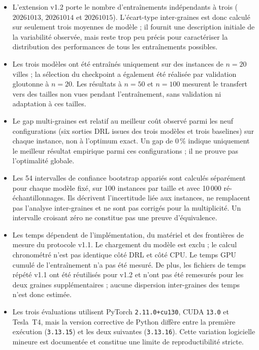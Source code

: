 \documentclass[12pt, a4paper, twoside, openright]{book}
\begin{document}
\begin{itemize}
\item L'extension v1.2 porte le nombre d'entraînements indépendants à trois
($20261013$, $20261014$ et $20261015$). L'écart-type inter-graines est donc
calculé sur seulement trois moyennes de modèle ; il fournit une description
initiale de la variabilité observée, mais reste trop peu précis pour
caractériser la distribution des performances de tous les entraînements
possibles.

\item Les trois modèles ont été entraînés uniquement sur des instances de
$n=20$ villes ; la sélection du checkpoint a également été réalisée par
validation gloutonne à $n=20$. Les résultats à $n=50$ et $n=100$ mesurent le
transfert vers des tailles non vues pendant l'entraînement, sans validation
ni adaptation à ces tailles.

\item Le gap multi-graines est relatif au meilleur coût observé parmi les
neuf configurations (six sorties DRL issues des trois modèles et trois
baselines) sur chaque instance, non à l'optimum exact. Un gap de $0\,\%$
indique uniquement le meilleur résultat empirique parmi ces configurations ;
il ne prouve pas l'optimalité globale.

\item Les 54 intervalles de confiance bootstrap appariés sont calculés
séparément pour chaque modèle fixé, sur 100 instances par taille et avec
10\,000 ré-échantillonnages. Ils décrivent l'incertitude liée aux instances,
ne remplacent pas l'analyse inter-graines et ne sont pas corrigés pour la
multiplicité. Un intervalle croisant zéro ne constitue pas une preuve
d'équivalence.

\item Les temps dépendent de l'implémentation, du matériel et des frontières
de mesure du protocole v1.1. Le chargement du modèle est exclu ; le calcul
chronométré n'est pas identique côté DRL et côté CPU. Le temps GPU cumulé de
l'entraînement n'a pas été mesuré. De plus, les fichiers de temps répété v1.1
ont été réutilisés pour v1.2 et n'ont pas été remesurés pour les deux graines
supplémentaires ; aucune dispersion inter-graines des temps n'est donc
estimée.

\item Les trois évaluations utilisent PyTorch \texttt{2.11.0+cu130}, CUDA
\texttt{13.0} et Tesla~T4, mais la version corrective de Python diffère entre
la première exécution (\texttt{3.13.15}) et les deux suivantes
(\texttt{3.13.16}). Cette variation logicielle mineure est documentée et
constitue une limite de reproductibilité stricte.


\end{itemize}
\end{document}
